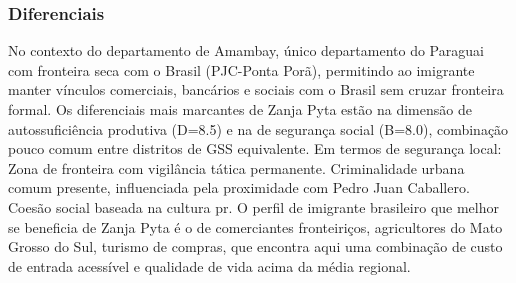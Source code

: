 \subsubsection*{Diferenciais}\label{dif-zanja-pyta-1304}
No contexto do departamento de Amambay, único departamento do Paraguai com fronteira seca com o Brasil (PJC-Ponta Porã), permitindo ao imigrante manter vínculos comerciais, bancários e sociais com o Brasil sem cruzar fronteira formal. Os diferenciais mais marcantes de Zanja Pyta estão na dimensão de autossuficiência produtiva (D=8.5) e na de segurança social (B=8.0), combinação pouco comum entre distritos de GSS equivalente. Em termos de segurança local: Zona de fronteira com vigilância tática permanente. Criminalidade urbana comum presente, influenciada pela proximidade com Pedro Juan Caballero. Coesão social baseada na cultura pr. O perfil de imigrante brasileiro que melhor se beneficia de Zanja Pyta é o de comerciantes fronteiriços, agricultores do Mato Grosso do Sul, turismo de compras, que encontra aqui uma combinação de custo de entrada acessível e qualidade de vida acima da média regional.

